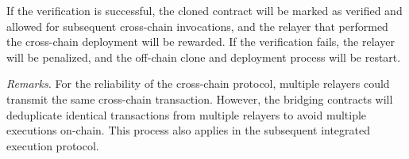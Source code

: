If the verification is successful, the cloned contract will be marked as verified and allowed for subsequent cross-chain invocations, and the relayer that performed the cross-chain deployment will be rewarded. 
If the verification fails, the relayer will be penalized, and the off-chain clone and deployment process will be restart. 

\noindent
\emph{Remarks.}
For the reliability of the cross-chain protocol, multiple relayers could transmit the same cross-chain transaction. 
However, the bridging contracts will deduplicate identical transactions from multiple relayers to avoid multiple executions on-chain.
This process also applies in the subsequent integrated execution protocol.